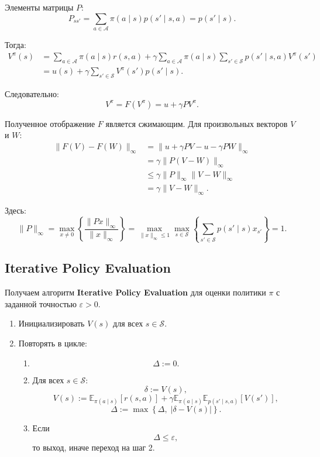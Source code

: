 \documentclass[12pt,a4paper]{article}
\begin{document}
Элементы матрицы $P$:
\[
P_{ss'}
=
\sum_{a \in \mathcal A}
\pi(a \mid s)p(s' \mid s,a)
=
p(s' \mid s).
\]

Тогда:
\[
\begin{aligned}
V^\pi(s)
&=
\sum_{a \in \mathcal A}
\pi(a \mid s)r(s,a)
+
\gamma
\sum_{a \in \mathcal A}
\pi(a \mid s)
\sum_{s' \in \mathcal S}
p(s' \mid s,a)V^\pi(s')
\\
&=
u(s)
+
\gamma
\sum_{s' \in \mathcal S}
V^\pi(s')p(s' \mid s).
\end{aligned}
\]

Следовательно:
\[
V^\pi = F(V^\pi) = u + \gamma P V^\pi.
\]

Полученное отображение $F$ является сжимающим. Для произвольных векторов $V$ и $W$:
\[
\begin{aligned}
\|F(V)-F(W)\|_\infty
&=
\|u+\gamma PV-u-\gamma PW\|_\infty
\\
&=
\gamma\|P(V-W)\|_\infty
\\
&\le
\gamma\|P\|_\infty \|V-W\|_\infty
\\
&=
\gamma \|V-W\|_\infty.
\end{aligned}
\]

Здесь:
\[
\|P\|_\infty
=
\max_{x \ne 0}
\left\{
\frac{\|Px\|_\infty}{\|x\|_\infty}
\right\}
=
\max_{\|x\|_\infty \le 1}
\max_{s \in \mathcal S}
\left\{
\sum_{s' \in \mathcal S}
p(s' \mid s)x_{s'}
\right\}
=
1.
\]

\subsection{Iterative Policy Evaluation}

Получаем алгоритм \textbf{Iterative Policy Evaluation} для оценки политики $\pi$ с заданной точностью $\varepsilon>0$.

\begin{enumerate}
    \item Инициализировать $V(s)$ для всех $s \in \mathcal S$.

    \item Повторять в цикле:
    \begin{enumerate}
        \item
        \[
        \Delta := 0.
        \]

        \item Для всех $s \in \mathcal S$:
        \[
        \delta := V(s),
        \]
        \[
        V(s)
        :=
        \mathbb E_{\pi(a\mid s)}
        \left[
        r(s,a)
        \right]
        +
        \gamma
        \mathbb E_{\pi(a\mid s)}
        \mathbb E_{p(s'\mid s,a)}
        \left[
        V(s')
        \right],
        \]
        \[
        \Delta := \max\left\{\Delta,\; |\delta - V(s)|\right\}.
        \]

        \item Если
        \[
        \Delta \le \varepsilon,
        \]
        то выход, иначе переход на шаг 2.
    \end{enumerate}
\end{enumerate}
\end{document}

